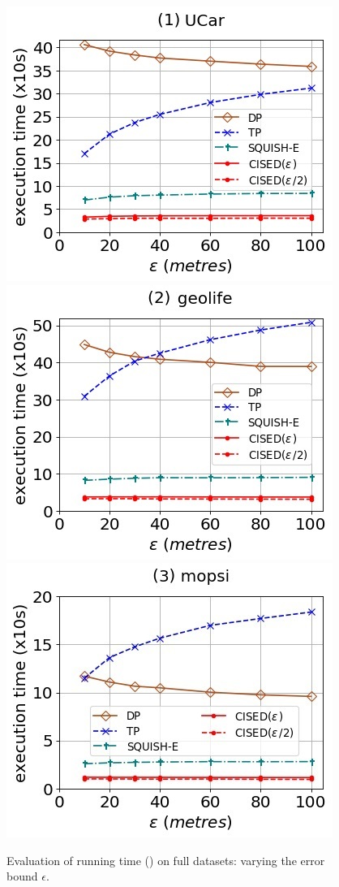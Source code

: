 \begin{figure}[tb!]
	\centering
	\includegraphics[scale=0.500]{Figures/Exp-SED-time-epsilon-service.jpg}	\hspace{2ex}
	\includegraphics[scale=0.500]{Figures/Exp-SED-time-epsilon-geolife.jpg}	\hspace{2ex}
	\includegraphics[scale=0.500]{Figures/Exp-SED-time-epsilon-mopsi.jpg}	
	\vspace{-2ex}
	\caption{\small Evaluation of running time (\sed) on full datasets: varying the error bound $\epsilon$.}\label{fig:time-epsilon-sed}
	\vspace{-2ex}
\end{figure}

